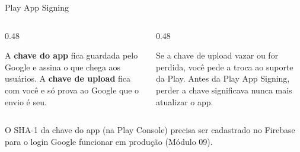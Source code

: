 \documentclass[aspectratio=169,10pt]{beamer}
\begin{document}
\begin{frame}{Play App Signing}
  \begin{center}
  \end{center}
  \begin{columns}[T]
    \begin{column}{0.48\textwidth}
      \begin{conceito}
        A \textbf{chave do app} fica guardada pelo Google e assina o que chega aos usuários. A \textbf{chave de upload} fica com você e só prova ao Google que o envio é seu.
      \end{conceito}
    \end{column}
    \begin{column}{0.48\textwidth}
      \begin{dica}[Vantagem]
        Se a chave de upload vazar ou for perdida, você pede a troca ao suporte da Play. Antes da Play App Signing, perder a chave significava nunca mais atualizar o app.
      \end{dica}
    \end{column}
  \end{columns}
  \begin{atencao}
    O SHA-1 da chave do app (na Play Console) precisa ser cadastrado no Firebase para o login Google funcionar em produção (Módulo 09).
  \end{atencao}
\end{frame}
\end{document}

